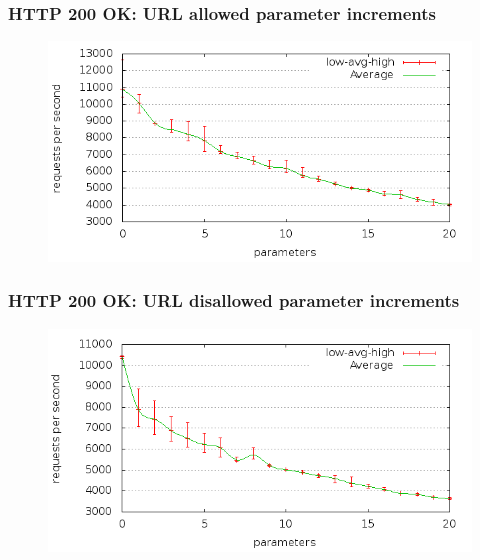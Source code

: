 \begin{frame}[noframenumbering]
  \frametitle{HTTP 200 OK: URL allowed parameter increments}
  \begin{figure}[H]
  \centering
  \includegraphics[scale=0.5] {../paper/images/results/200_with_naxsi_incremented_allowed_parameters/output.png}
  \end{figure}
\end{frame}

\begin{frame}[noframenumbering]
  \frametitle{HTTP 200 OK: URL disallowed parameter increments}
  \begin{figure}[H]
  \centering
  \includegraphics[scale=0.5] {../paper/images/results/200_with_naxsi_incremented_disallowed_parameters/output.png}
  \end{figure}
\end{frame}

